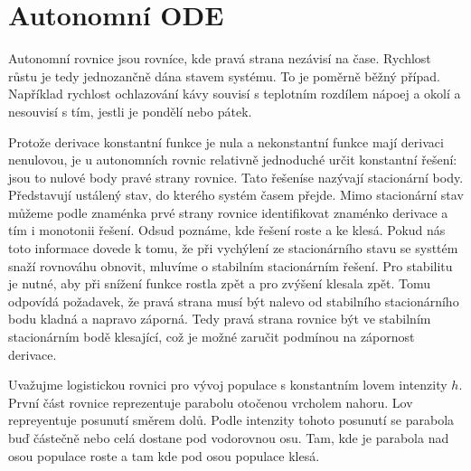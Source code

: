 \section*{Autonomní ODE}

Autonomní rovnice jsou rovníce, kde pravá strana nezávisí na čase. Rychlost růstu je tedy jednozančně dána stavem systému. To je poměrně běžný případ. Například rychlost ochlazování kávy souvisí s teplotním rozdílem nápoej a okolí a nesouvisí s tím, jestli je pondělí nebo pátek.

Protože derivace konstantní funkce je nula a nekonstantní funkce mají derivaci nenulovou, je u autonomních rovnic relativně jednoduché určit konstantní řešení: jsou to nulové body pravé strany rovnice. Tato řešeníse nazývají stacionární body. Představují ustálený stav, do kterého systém časem přejde. Mimo stacionární stav můžeme podle znaménka prvé strany rovnice identifikovat znaménko derivace a tím i monotonii řešení. Odsud poznáme, kde řešení roste a ke klesá. Pokud nás toto informace dovede k tomu, že při vychýlení ze stacionárního stavu se systtém snaží rovnováhu obnovit, mluvíme o stabilním stacionárním řešení. Pro stabilitu je nutné, aby při snížení funkce rostla zpět a pro zvýšení klesala zpět. Tomu odpovídá požadavek, že pravá strana musí být nalevo od stabilního stacionárního bodu kladná a napravo záporná. Tedy pravá strana rovnice být ve stabilním stacionárním bodě klesající, což je možné zaručit podmínou na zápornost derivace.


Uvažujme logistickou rovnici pro vývoj populace s konstantním lovem intenzity $h$. První část rovnice reprezentuje parabolu otočenou vrcholem nahoru. Lov repreyentuje posunutí směrem dolů. Podle intenzity tohoto posunutí se parabola buď částečně nebo celá dostane pod vodorovnou osu. Tam, kde je parabola nad osou populace roste a tam kde pod osou populace klesá. 

